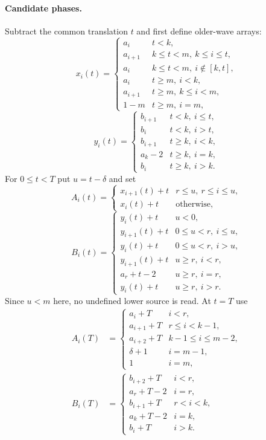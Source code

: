 \paragraph{Candidate phases.}
Subtract the common translation $t$ and first define older-wave arrays:
\begin{equation}\label{eq:older-x}
 x_i(t)=\begin{cases}
 a_i&t<k,\\
 a_{i+1}&k\le t<m,\ k\le i\le t,\\
 a_i&k\le t<m,\ i\notin[k,t],\\
 a_i&t\ge m,\ i<k,\\
 a_{i+1}&t\ge m,\ k\le i<m,\\
 1-m&t\ge m,\ i=m,
 \end{cases}
\end{equation}
\begin{equation}\label{eq:older-y}
 y_i(t)=\begin{cases}
 b_{i+1}&t<k,\ i\le t,\\
 b_i&t<k,\ i>t,\\
 b_{i+1}&t\ge k,\ i<k,\\
 a_k-2&t\ge k,\ i=k,\\
 b_i&t\ge k,\ i>k.
 \end{cases}
\end{equation}
For $0\le t<T$ put $u=t-\delta$ and set
\begin{equation}\label{eq:distinct-A}
 A_i(t)=\begin{cases}x_{i+1}(t)+t&r\le u,\ r\le i\le u,\\x_i(t)+t&\text{otherwise},\end{cases}
\end{equation}
\begin{equation}\label{eq:distinct-B}
 B_i(t)=\begin{cases}
 y_i(t)+t&u<0,\\
 y_{i+1}(t)+t&0\le u<r,\ i\le u,\\
 y_i(t)+t&0\le u<r,\ i>u,\\
 y_{i+1}(t)+t&u\ge r,\ i<r,\\
 a_r+t-2&u\ge r,\ i=r,\\
 y_i(t)+t&u\ge r,\ i>r.
 \end{cases}
\end{equation}
Since $u<m$ here, no undefined lower source is read. At $t=T$ use
\begin{align}
 A_i(T)&=\begin{cases}
 a_i+T&i<r,\\
 a_{i+1}+T&r\le i<k-1,\\
 a_{i+2}+T&k-1\le i\le m-2,\\
 \delta+1&i=m-1,\\1&i=m,
 \end{cases}\label{eq:distinct-terminal-A}\\
 B_i(T)&=\begin{cases}
 b_{i+2}+T&i<r,\\a_r+T-2&i=r,\\b_{i+1}+T&r<i<k,\\
 a_k+T-2&i=k,\\b_i+T&i>k.
 \end{cases}\label{eq:distinct-terminal-B}
\end{align}
